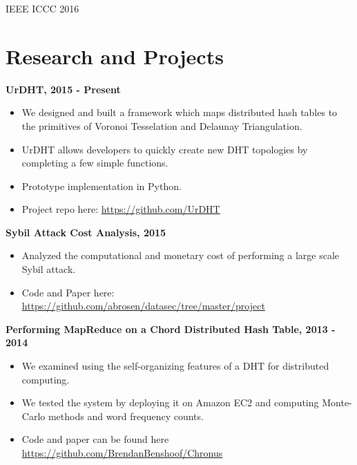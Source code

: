 \documentclass{res}
\begin{document}
\begin{resume}
\begin{enumerate}
	IEEE ICCC 2016 
        
    \end{enumerate}
    
    
  
\section{Research and Projects}

{\bf UrDHT, 2015 - Present }
\begin{itemize}
	\item We designed and built a framework which maps distributed hash tables to the primitives of Voronoi Tesselation and Delaunay Triangulation.
	\item UrDHT allows developers to quickly create new DHT topologies by completing a few simple functions. 
	\item Prototype implementation in Python.
	\item Project repo here: \url{https://github.com/UrDHT}
\end{itemize}

{\bf Sybil Attack Cost Analysis, 2015}
\begin{itemize}
	\item Analyzed the computational and monetary cost of performing a large scale Sybil attack.
	\item Code and Paper here: \url{https://github.com/abrosen/datasec/tree/master/project}
\end{itemize}



{\bf Performing MapReduce on a Chord Distributed Hash Table, 2013 - 2014}
    \begin{itemize}
    \item We examined using the self-organizing features of a DHT for distributed computing.
    \item We tested the system by deploying it on Amazon EC2 and computing Monte-Carlo methods and word frequency counts. 
    \item Code and paper can be found here \url{https://github.com/BrendanBenshoof/Chronus}
    \end{itemize}
    

\end{resume}
\end{document}
